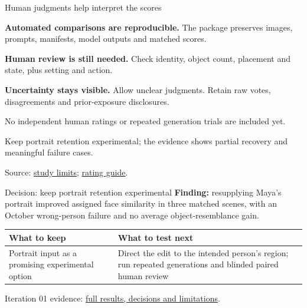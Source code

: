 \documentclass[aspectratio=169,11pt]{beamer}
\newcommand{\source}[1]{\par\vfill{\fontsize{7}{8}\selectfont\color{muted}#1\par}}
\newcommand{\repo}[2]{\href{https://github.com/aking526/ai-camera-roll/blob/84bd89bb9e947a0866aca6654ffc04a3a5d9119f/#1}{#2}}
\begin{document}
\begin{frame}{Human judgments help interpret the scores}
\raggedright
\textbf{Automated comparisons are reproducible.} The package preserves images, prompts, manifests, model outputs and matched scores.\par
\vspace{5mm}
\textbf{Human review is still needed.} Check identity, object count, placement and state, plus setting and action.\par
\vspace{5mm}
\textbf{Uncertainty stays visible.} Allow unclear judgments. Retain raw votes, disagreements and prior-exposure disclosures.\par
\vspace{3mm}
\alert{No independent human ratings or repeated generation trials are included yet.}\par
\small Keep portrait retention experimental; the evidence shows partial recovery and meaningful failure cases.
\source{Source: \repo{experiments/iteration_01_portrait_retention_2026-11-04/ANALYSIS.md}{study limits}; \repo{demo_site/RATING_GUIDE.txt}{rating guide}.}
\end{frame}

\begin{frame}{Decision: keep portrait retention experimental}
\textbf{Finding:} resupplying Maya's portrait improved assigned face similarity in three matched scenes, with an October wrong-person failure and no average object-resemblance gain.\par
\vspace{4mm}
\renewcommand{\arraystretch}{1.4}
\begin{tabularx}{\textwidth}{@{}>{\raggedright\arraybackslash}X >{\raggedright\arraybackslash}X@{}}
\toprule
\textbf{What to keep} & \textbf{What to test next}\\
\midrule
Portrait input as a promising experimental option & Direct the edit to the intended person's region; run repeated generations and blinded paired human review\\
\bottomrule
\end{tabularx}\par
\vspace{4mm}
\small
\source{Iteration 01 evidence: \repo{experiments/iteration_01_portrait_retention_2026-11-04/ANALYSIS.md}{full results, decisions and limitations}.}
\end{frame}
\end{document}
